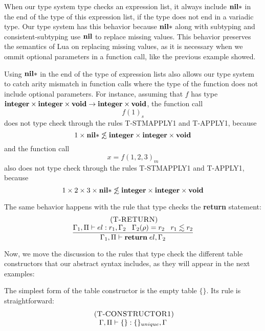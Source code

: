 When our type system type checks an expression list,
it always include $\mathbf{nil}{*}$ in the end of the type of this expression list,
if the type does not end in a variadic type.
Our type system has this behavior because $\mathbf{nil}{*}$ along with subtyping
and consistent-subtyping use $\mathbf{nil}$ to replace missing values.
This behavior preserves the semantics of Lua on replacing missing values,
as it is necessary when we ommit optional parameters in a function call,
like the previous example showed.

Using $\mathbf{nil}{*}$ in the end of the type of expression lists also allows
our type system to catch arity mismatch in function calls where
the type of the function does not include optional parameters.
For instance, assuming that $f$ has type
$\mathbf{integer} \times \mathbf{integer} \times \mathbf{void} \rightarrow \mathbf{integer} \times \mathbf{void}$,
the function call
\[
f(1)_{s}
\]
does not type check through the rules \textsc{T-STMAPPLY1} and \textsc{T-APPLY1}, because
\[
1 \times \mathbf{nil}{*} \not\lesssim \mathbf{integer} \times \mathbf{integer} \times \mathbf{void}
\]
and the function call
\[
x = f(1,2,3)_{m}
\]
also does not type check through the rules \textsc{T-STMAPPLY1} and \textsc{T-APPLY1}, because
\[
1 \times 2 \times 3 \times \mathbf{nil}{*} \not\lesssim \mathbf{integer} \times \mathbf{integer} \times \mathbf{void}
\]

The same behavior happens with the rule that type checks the \textbf{return}
statement:
\[
\begin{array}{c}
\; (\textsc{T-RETURN})\\
\dfrac{\Gamma_{1}, \Pi \vdash el:r_{1}, \Gamma_{2} \;\;\;
       \Gamma_{2}(\rho) = r_{2} \;\;\;
       r_{1} \lesssim r_{2}}
      {\Gamma_{1}, \Pi \vdash \mathbf{return} \; el,\Gamma_{2}}
\end{array}
\]

Now, we move the discussion to the rules that type check the
different table constructors that our abstract syntax includes,
as they will appear in the next examples:

The simplest form of the table constructor is the empty table $\{\}$.
Its rule is straightforward:
\[
\begin{array}{c}
\; (\textsc{T-CONSTRUCTOR1})\\
\Gamma, \Pi \vdash \{\}:\{\}_{unique}, \Gamma
\end{array}
\]

